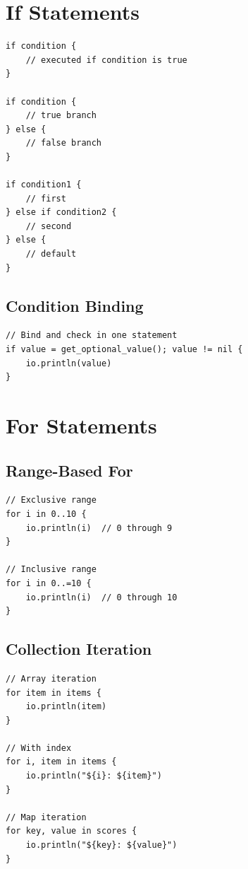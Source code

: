\section{If Statements}

\begin{lstlisting}
if condition {
    // executed if condition is true
}

if condition {
    // true branch
} else {
    // false branch
}

if condition1 {
    // first
} else if condition2 {
    // second
} else {
    // default
}
\end{lstlisting}

\subsection{Condition Binding}

\begin{lstlisting}
// Bind and check in one statement
if value = get_optional_value(); value != nil {
    io.println(value)
}
\end{lstlisting}

\section{For Statements}

\subsection{Range-Based For}

\begin{lstlisting}
// Exclusive range
for i in 0..10 {
    io.println(i)  // 0 through 9
}

// Inclusive range
for i in 0..=10 {
    io.println(i)  // 0 through 10
}
\end{lstlisting}

\subsection{Collection Iteration}

\begin{lstlisting}
// Array iteration
for item in items {
    io.println(item)
}

// With index
for i, item in items {
    io.println("${i}: ${item}")
}

// Map iteration
for key, value in scores {
    io.println("${key}: ${value}")
}
\end{lstlisting}

